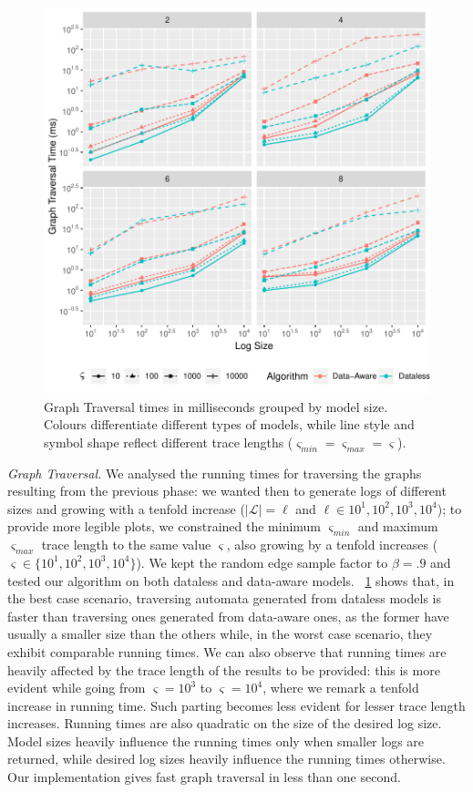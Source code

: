 \documentclass[sigconf]{acmart}
\begin{document}
\begin{figure}[!t]
\centering
\includegraphics[width=\linewidth]{fig/TraversingTimesSolo}
\caption{Graph Traversal times in milliseconds grouped by model size. Colours differentiate different types of models, while line style and symbol shape reflect different trace lengths ($\varsigma_\textit{min}=\varsigma_\textit{max}=\varsigma$).}\label{traversetimesolo}
\end{figure}
\textit{Graph Traversal.} We analysed the running times for traversing the graphs resulting from the previous phase: we wanted then to generate logs of different sizes and growing with a tenfold increase ($|\mathcal{L}|=\ell$ and $\ell\in{10^1,10^2,10^3,10^4}$); to provide more legible plots, we constrained the minimum $\varsigma_\textit{min}$ and maximum $\varsigma_\textit{max}$ trace length to the same value $\varsigma$, also growing by a tenfold increases ($\varsigma\in\{10^1,10^2,10^3,10^4\}$). We kept the random edge sample factor to $\beta=.9$ and tested our algorithm on both dataless and data-aware models. \figurename~\ref{traversetimesolo} shows that,  in the best case scenario, traversing automata generated from dataless models is faster than traversing ones generated from data-aware ones, as the former have usually a smaller size than the others while, in the worst case scenario, they exhibit comparable running times. We can also observe that running times are heavily affected by the trace length of the results to be provided: this is more evident while going from $\varsigma=10^3$ to $\varsigma=10^4$, where we remark a tenfold increase in running time. Such parting becomes less evident for lesser trace length increases. Running times are also quadratic on the size of the desired log size. Model sizes heavily influence the running times only when smaller logs are returned, while desired log sizes heavily influence the running times otherwise. Our implementation gives fast graph traversal in less than one second. 
 
\end{document}
